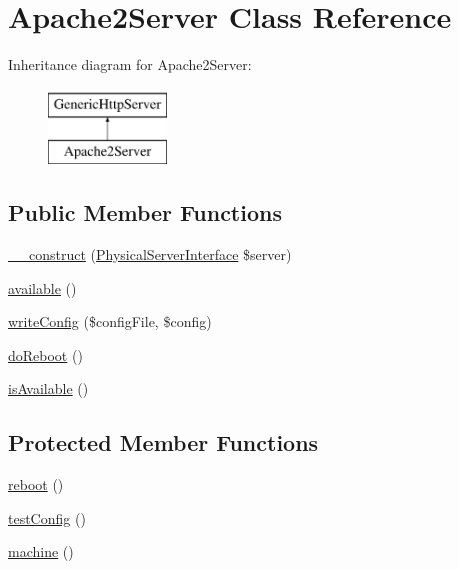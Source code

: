 \hypertarget{classApache2Server}{\section{Apache2\-Server Class Reference}
\label{classApache2Server}
}
Inheritance diagram for Apache2\-Server\-:\begin{figure}[H]
\begin{center}
\leavevmode
\includegraphics[height=2.000000cm]{classApache2Server}
\end{center}
\end{figure}
\subsection*{Public Member Functions}
\begin{DoxyCompactItemize}
\item 
\hyperlink{classApache2Server_a7443b831995b43c9aedea4e7f64f10fc}{\-\_\-\-\_\-construct} (\hyperlink{interfacePhysicalServerInterface}{Physical\-Server\-Interface} \$server)
\item 
\hyperlink{classApache2Server_ae2bf30b4525a3a8d8b6e2d3ee5542d88}{available} ()
\item 
\hyperlink{classApache2Server_ad0fc9b83e68c5527ccdf7d612daad5c1}{write\-Config} (\$config\-File, \$config)
\item 
\hyperlink{classGenericHttpServer_aadaefaa2c7866c61b6e5c47f5ba9cb52}{do\-Reboot} ()
\item 
\hyperlink{classGenericHttpServer_a09f17032d29735f1e4ebcf0b8a8e110f}{is\-Available} ()
\end{DoxyCompactItemize}
\subsection*{Protected Member Functions}
\begin{DoxyCompactItemize}
\item 
\hyperlink{classApache2Server_a329153f00297288281ed96fb2c5f3cea}{reboot} ()
\item 
\hyperlink{classApache2Server_aaea54c27eeda777738f8db4ddaaff4d5}{test\-Config} ()
\item 
\hyperlink{classGenericHttpServer_a5a3529075164ac5fd6ed20753fb14629}{machine} ()
\end{DoxyCompactItemize}


